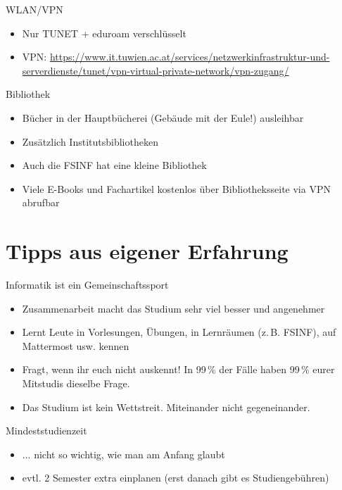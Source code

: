 \documentclass{beamer}
\begin{document}
\begin{frame}{WLAN/VPN}
    \begin{itemize}
        \item Nur TUNET + eduroam verschlüsselt
        \item VPN: \url{https://www.it.tuwien.ac.at/services/netzwerkinfrastruktur-und-serverdienste/tunet/vpn-virtual-private-network/vpn-zugang/}
    \end{itemize}
\end{frame}

\begin{frame}{Bibliothek}
    \begin{itemize}
        \item Bücher in der Hauptbücherei (Gebäude mit der Eule!) ausleihbar
        \item Zusätzlich Institutsbibliotheken
        \item Auch die FSINF hat eine kleine Bibliothek
        \item Viele E-Books und Fachartikel kostenlos über Bibliotheksseite via VPN
            abrufbar
    \end{itemize}
\end{frame}

\section{Tipps aus eigener Erfahrung}

\begin{frame}{Informatik ist ein Gemeinschaftssport}
    \begin{itemize}
        \item Zusammenarbeit macht das Studium sehr viel besser und angenehmer
        \item Lernt Leute in Vorlesungen, Übungen, in Lernräumen (z.\,B. FSINF), auf
            Mattermost usw. kennen
        \item Fragt, wenn ihr euch nicht auskennt! In 99\,\% der Fälle haben 99\,\%
            eurer Mitstudis dieselbe Frage.
        \item Das Studium ist kein Wettstreit. Miteinander nicht gegeneinander.
    \end{itemize}
\end{frame}

\begin{frame}{Mindeststudienzeit}
    \begin{itemize}
        \item ... nicht so wichtig, wie man am Anfang glaubt
        \item evtl. 2 Semester extra einplanen (erst danach gibt es Studiengebühren)
    \end{itemize}
\end{frame}
\end{document}
